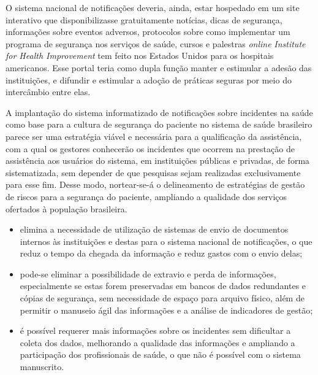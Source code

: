 \documentclass{article}
\begin{document}
O sistema nacional de notificações deveria, ainda, estar hospedado em um site interativo
        que disponibilizasse gratuitamente notícias, dicas de segurança, informações sobre eventos
        adversos, protocolos sobre como implementar um programa de segurança nos serviços de saúde,
        cursos e palestras %
\textit{online}
\textit{Institute for Health
          Improvement}
 tem feito nos Estados Unidos para os hospitais americanos. Esse
        portal teria como dupla função manter e estimular a adesão das instituições, e difundir e
        estimular a adoção de práticas seguras por meio do intercâmbio entre elas.

A implantação do sistema informatizado de notificações sobre incidentes na saúde como base
        para a cultura de segurança do paciente no sistema de saúde brasileiro parece ser uma
        estratégia viável e necessária para a qualificação da assistência, com a qual os gestores
        conhecerão os incidentes que ocorrem na prestação de assistência aos usuários do sistema, em
        instituições públicas e privadas, de forma sistematizada, sem depender de que pesquisas
        sejam realizadas exclusivamente para esse fim. Desse modo, nortear-se-á o delineamento de
        estratégias de gestão de riscos para a segurança do paciente, ampliando a qualidade dos
        serviços ofertados à população brasileira.

\begin{itemize}
\item %

elimina a necessidade de utilização de sistemas de envio de documentos internos às
            instituições e destas para o sistema nacional de notificações, o que reduz o tempo da
            chegada da informação e reduz gastos com o envio delas;

\item %

pode-se eliminar a possibilidade de extravio e perda de informações, especialmente se
            estas forem preservadas em bancos de dados redundantes e cópias de segurança, sem
            necessidade de espaço para arquivo físico, além de permitir o manuseio ágil das
            informações e a análise de indicadores de gestão;

\item %

é possível requerer mais informações sobre os incidentes sem dificultar a coleta dos
            dados, melhorando a qualidade das informações e ampliando a participação dos
            profissionais de saúde, o que não é possível com o sistema manuscrito.

 \end{itemize}
\end{document}
